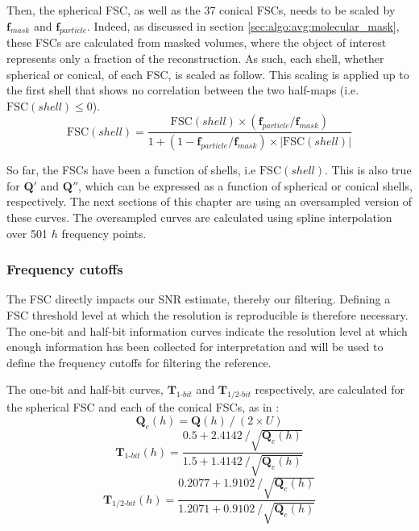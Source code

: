 Then, the spherical FSC, as well as the 37 conical FSCs, needs to be scaled by $\bm{f}_{mask}$ and $\bm{f}_{particle}$. Indeed, as discussed in section \ref{sec:algo:avg:molecular_mask}, these FSCs are calculated from masked volumes, where the object of interest represents only a fraction of the reconstruction. As such, each shell, whether spherical or conical, of each FSC, is scaled as follow. This scaling is applied up to the first shell that shows no correlation between the two half-maps (i.e. $\bm{\mathrm{FSC}}(shell)\leqslant0$).
\begin{equation} \label{eq:scale_FSC}
    \bm{\mathrm{FSC}}(shell) = \dfrac{ \bm{\mathrm{FSC}}(shell) \times (\bm{f}_{particle}/\bm{f}_{mask})}{1 + (1 - \bm{f}_{particle}/\bm{f}_{mask}) \times |\bm{\mathrm{FSC}}(shell)|}
\end{equation}

So far, the FSCs have been a function of shells, i.e $\bm{\mathrm{FSC}}(shell)$. This is also true for $\bm{Q}'$ and $\bm{Q}''$, which can be expressed as a function of spherical or conical shells, respectively. The next sections of this chapter are using an oversampled version of these curves. The oversampled curves are calculated using spline interpolation over 501 $h$ frequency points.

\subsubsection{Frequency cutoffs}  \label{sec:algo:avg:res_cutoffs}

The FSC directly impacts our SNR estimate, thereby our filtering. Defining a FSC threshold level at which the resolution is reproducible is therefore necessary. The one-bit and half-bit information curves indicate the resolution level at which enough information has been collected for interpretation and will be used to define the frequency cutoffs for filtering the reference.

The one-bit and half-bit curves, $\bm{T}_{1\text{-}bit}$ and $\bm{T}_{1/2\text{-}bit}$ respectively, are calculated for the spherical FSC and each of the conical FSCs, as in \cite{fsc_mvh}:
\begin{equation} \label{eq:n_effective}
    \bm{Q}_{e}(h) = \bm{Q}(h)\ /\ (2 \times U)
\end{equation}
\begin{equation}
    \bm{T}_{1\text{-}bit}(h) = \dfrac{ 0.5 + 2.4142\ / \sqrt{\bm{Q}_{e}(h)} } { 1.5 + 1.4142\ / \sqrt{\bm{Q}_{e}(h)} }
\end{equation}
\begin{equation}
    \bm{T}_{1/2\text{-}bit}(h) = \dfrac{ 0.2077 + 1.9102\ / \sqrt{\bm{Q}_{e}(h)} } { 1.2071 + 0.9102\ / \sqrt{\bm{Q}_{e}(h)} }
\end{equation}


